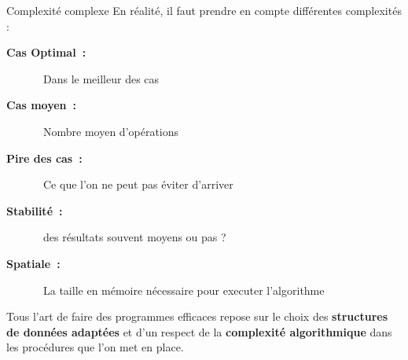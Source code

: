 \begin{frame}{Complexité complexe}
    En réalité, il faut prendre en compte différentes complexités :
    \begin{description}
        \item[\textbf{Cas Optimal :}]         Dans le meilleur des cas
        \item[\textbf{Cas moyen :}]           Nombre moyen d'opérations
        \item[\textbf{Pire des cas :}]        Ce que l'on ne peut pas éviter d'arriver
        \item[\textbf{Stabilité :}]           des résultats souvent moyens ou pas ?
        \item[\textbf{Spatiale :}]            La taille en mémoire nécessaire pour executer l'algorithme
    \end{description}
\end{frame}

\begin{frame}{}
    Tous l'art de faire des programmes efficaces repose sur le choix des \textbf{structures de données adaptées} et d'un respect de la \textbf{complexité algorithmique} dans les procédures que l'on met en place.
\end{frame}
